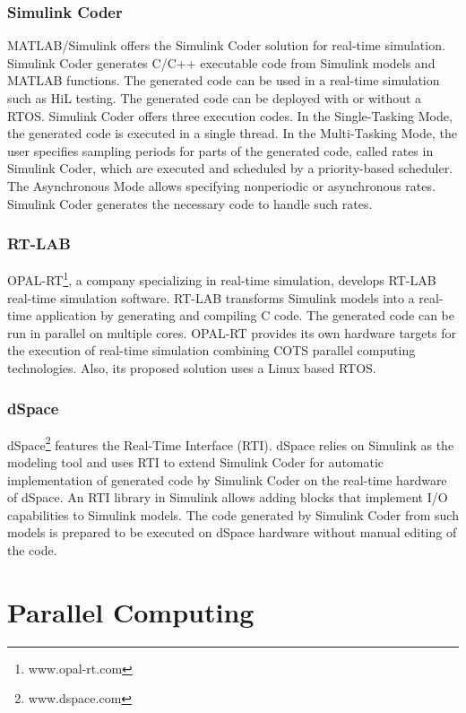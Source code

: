 \subsubsection{Simulink Coder}

MATLAB/Simulink offers the Simulink Coder solution for real-time simulation. Simulink Coder generates C/C++ executable code from Simulink models and MATLAB functions. The generated code can be used in a real-time simulation such as HiL testing. The generated code can be deployed with or without a RTOS. Simulink Coder offers three execution codes. In the Single-Tasking Mode, the generated code is executed in a single thread. In the Multi-Tasking Mode, the user specifies sampling periods for parts of the generated code, called rates in Simulink Coder, which are executed and scheduled by a priority-based scheduler. The Asynchronous Mode allows specifying nonperiodic or asynchronous rates. Simulink Coder generates the necessary code to handle such rates.

\subsubsection{RT-LAB}

OPAL-RT\footnote{www.opal-rt.com}, a company specializing in real-time simulation, develops RT-LAB real-time simulation software. RT-LAB transforms Simulink models into a real-time application by generating and compiling C code. The generated code can be run in parallel on multiple cores. OPAL-RT provides its own hardware targets for the execution of real-time simulation combining COTS parallel computing technologies. Also, its proposed solution uses a Linux based RTOS.

\subsubsection{dSpace}

dSpace\footnote{www.dspace.com} features the Real-Time Interface (RTI). dSpace relies on Simulink as the modeling tool and uses RTI to extend Simulink Coder for automatic implementation of generated code by Simulink Coder on the real-time hardware of dSpace. An RTI library in Simulink allows adding blocks that implement I/O capabilities to Simulink models. The code generated by Simulink Coder from such models is prepared to be executed on dSpace hardware without manual editing of the code. 


\section{Parallel Computing}

